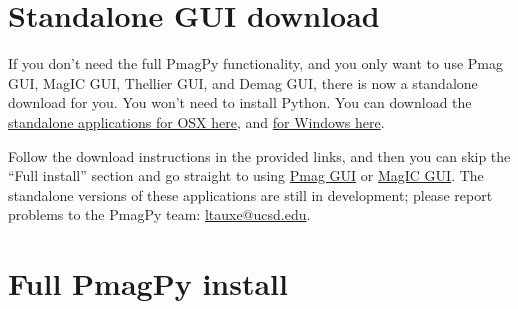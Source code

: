 \documentclass[11pt]{book}
\begin{document}
{
\section{Standalone GUI download}

If you don't need the full PmagPy functionality, and you only want to use Pmag GUI, MagIC GUI, Thellier GUI, and Demag GUI, there is now a standalone download for you.  You won't need to install Python.
You can download the \href{https://github.com/PmagPy/PmagPy-Standalone-OSX/releases/latest}{standalone applications for OSX here}, and \href{https://github.com/PmagPy/PmagPy-Standalone-Windows/releases/latest}{for Windows here}.

Follow the download instructions in the provided links, and then you can skip the ``Full install'' section and go straight to using \href{#pmag_gui.py}{Pmag GUI} or \href{#magic_gui.py}{MagIC GUI}.  The standalone versions of these applications are still in development; please report problems to the PmagPy team: \href{mailto:ltauxe@ucsd.edu}{ltauxe@ucsd.edu}.

\section{Full PmagPy install}

 \begin{enumerate}


\end{enumerate}}
\end{document}
